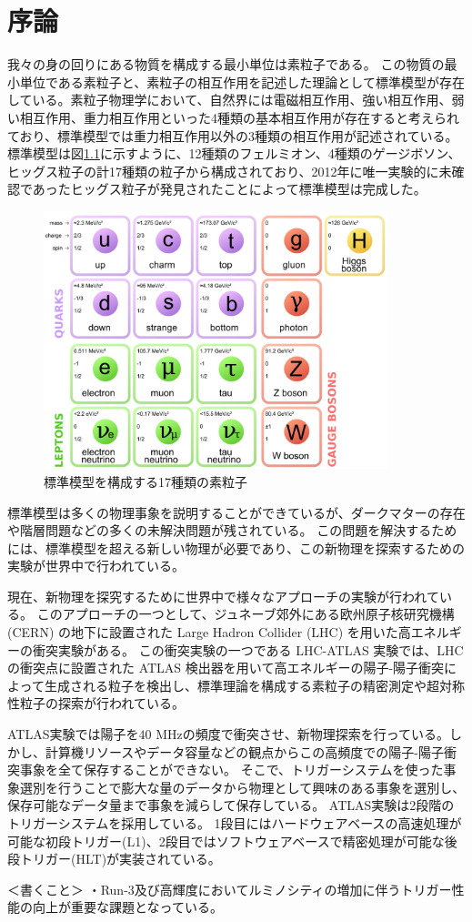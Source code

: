 \chapter{序論}
我々の身の回りにある物質を構成する最小単位は素粒子である。
この物質の最小単位である素粒子と、素粒子の相互作用を記述した理論として標準模型が存在している。素粒子物理学において、自然界には電磁相互作用、強い相互作用、弱い相互作用、重力相互作用といった4種類の基本相互作用が存在すると考えられており、標準模型では重力相互作用以外の3種類の相互作用が記述されている。
標準模型は図\ref{fig:標準模型}に示すように、12種類のフェルミオン、4種類のゲージボソン、ヒッグス粒子の計17種類の粒子から構成されており、2012年に唯一実験的に未確認であったヒッグス粒子が発見されたことによって標準模型は完成した。
\begin{figure}[tb]
  \centering
  \includegraphics[clip, width=10cm]{fig/1/standardmodel.jpg}
  \caption{標準模型を構成する17種類の素粒子}
  \label{fig:標準模型}
\end{figure}


標準模型は多くの物理事象を説明することができているが、ダークマターの存在や階層問題などの多くの未解決問題が残されている。
この問題を解決するためには、標準模型を超える新しい物理が必要であり、この新物理を探索するための実験が世界中で行われている。

現在、新物理を探究するために世界中で様々なアプローチの実験が行われている。
このアプローチの一つとして、ジュネーブ郊外にある欧州原子核研究機構 (CERN) の地下に設置された Large Hadron Collider (LHC) を用いた高エネルギーの衝突実験がある。
この衝突実験の一つである LHC-ATLAS 実験では、LHC の衝突点に設置された ATLAS 検出器を用いて高エネルギーの陽子-陽子衝突によって生成される粒子を検出し、標準理論を構成する素粒子の精密測定や超対称性粒子の探索が行われている。

ATLAS実験では陽子を$40$ MHzの頻度で衝突させ、新物理探索を行っている。しかし、計算機リソースやデータ容量などの観点からこの高頻度での陽子-陽子衝突事象を全て保存することができない。
そこで、トリガーシステムを使った事象選別を行うことで膨大な量のデータから物理として興味のある事象を選別し、保存可能なデータ量まで事象を減らして保存している。
ATLAS実験は2段階のトリガーシステムを採用している。
1段目にはハードウェアベースの高速処理が可能な初段トリガー(L1)、2段目ではソフトウェアベースで精密処理が可能な後段トリガー(HLT)が実装されている。




＜書くこと＞
・Run-3及び高輝度においてルミノシティの増加に伴うトリガー性能の向上が重要な課題となっている。





